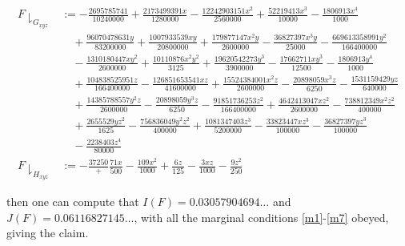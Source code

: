 \begin{align*}
F\downharpoonright_{G_{xyz}} &:= -\frac{2695785741}{10240000} + \frac{2173499391x}{1280000} - \frac{12242903151x^2}{2560000} + \frac{52219413x^3}{10000} - \frac{1806913x^4}{1000} \\
&\quad + \frac{96070478631y}{83200000} + \frac{1007933539xy}{20800000} + \frac{179877147x^2y}{2600000} - \frac{36827397x^3y}{25000} - \frac{669613358991y^2}{166400000} \\
&\quad - \frac{1310180447xy^2}{2600000} + \frac{10110876x^2y^2}{3125} + \frac{19620542273y^3}{3900000} - \frac{17662711xy^3}{12500} - \frac{1806913y^4}{1000} \\
&\quad + \frac{104838525951z}{166400000} - \frac{126851653541xz}{41600000} + \frac{15524384001x^2z}{2600000} - \frac{20898059x^3z}{6250} - \frac{1531159429yz}{640000} \\
&\quad + \frac{14385788557y^2z}{2600000} - \frac{20898059y^3z}{6250} - \frac{91851736253z^2}{166400000} + \frac{4642413047xz^2}{2600000} - \frac{738812349x^2z^2}{400000} \\
&\quad + \frac{2655529yz^2}{1625} - \frac{756836049y^2z^2}{400000} + \frac{1081347403z^3}{5200000} - \frac{33823447xz^3}{100000} - \frac{36827397yz^3}{100000} \\
&\quad - \frac{2238403z^4}{80000}\\
F\downharpoonright_{H_{xyz}} &:= -\frac{37{250}} + \frac{71x}{500} - \frac{109x^2}{1000} + \frac{6z}{125} - \frac{3xz}{1000} - \frac{9z^2}{250}
\end{align*}

then one can compute that $I(F) = 0.03057904694\dots$ and $J(F) = 0.06116827145\dots$, with all the marginal conditions \eqref{m1}-\eqref{m7} obeyed, giving the claim.
